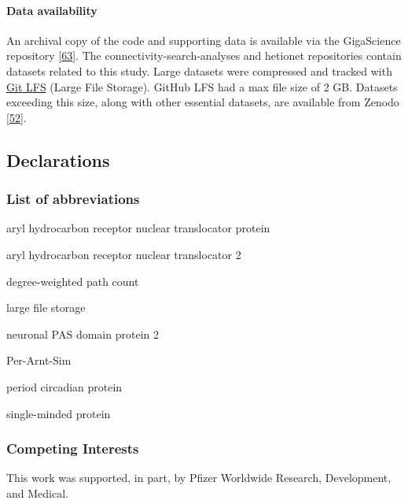 \hypertarget{data-availability}{%
\paragraph{Data availability}\label{data-availability}}

An archival copy of the code and supporting data is available via the GigaScience repository {[}\protect\hyperlink{ref-hHRphzV0}{63}{]}.
The connectivity-search-analyses and hetionet repositories contain datasets related to this study.
Large datasets were compressed and tracked with \href{https://git-lfs.github.com/}{Git LFS} (Large File Storage).
GitHub LFS had a max file size of 2 GB.
Datasets exceeding this size, along with other essential datasets, are available from Zenodo {[}\protect\hyperlink{ref-pkJqqM2W}{52}{]}.

\hypertarget{declarations}{%
\subsection{Declarations}\label{declarations}}

\hypertarget{list-of-abbreviations}{%
\subsubsection{List of abbreviations}\label{list-of-abbreviations}}

\begin{description}
\tightlist
\item[Arnt]
aryl hydrocarbon receptor nuclear translocator protein
\item[ARNT2]
aryl hydrocarbon receptor nuclear translocator 2
\item[DWPC]
degree-weighted path count
\item[LFS]
large file storage
\item[NPAS2]
neuronal PAS domain protein 2
\item[PAS]
Per-Arnt-Sim
\item[Per]
period circadian protein
\item[Sim]
single-minded protein
\end{description}

\hypertarget{competing-interests}{%
\subsubsection{Competing Interests}\label{competing-interests}}

This work was supported, in part, by Pfizer Worldwide Research, Development, and Medical.

